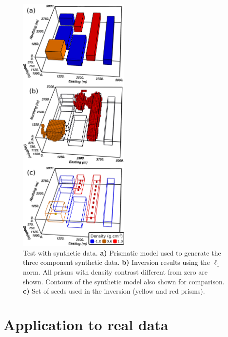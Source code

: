 \documentclass{segabs}
\begin{document}
\begin{figure}[htb]
    \centering
        \includegraphics[width=5.5cm]{../synthetic/results_all_vert.png}
    \caption{Test with synthetic data.
    \textbf{a)} Prismatic model used to generate the three component synthetic data.
    \textbf{b)} Inversion results using the $\ell_1$ norm. All prisms with density contrast
    different from zero are shown.
    Contours of the synthetic model also shown for comparison.
    \textbf{c)} Set of seeds used in the inversion (yellow and red prisms).
    \label{fig:synth-res}}
    \vspace{-0.4cm}
\end{figure}

\vspace{-0.4cm}
\section{Application to real data}
\end{document}
